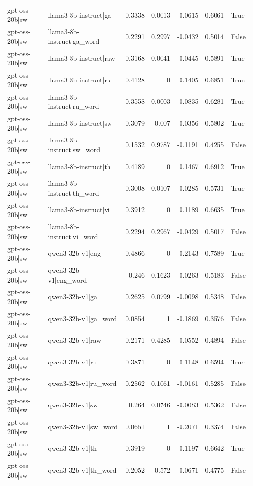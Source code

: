 \begin{table}
\begin{tabular}{l l r r r r l}
gpt-oss-20b|sw & llama3-8b-instruct|ga & 0.3338 & 0.0013 & 0.0615 & 0.6061 & True \\
gpt-oss-20b|sw & llama3-8b-instruct|ga_word & 0.2291 & 0.2997 & -0.0432 & 0.5014 & False \\
gpt-oss-20b|sw & llama3-8b-instruct|raw & 0.3168 & 0.0041 & 0.0445 & 0.5891 & True \\
gpt-oss-20b|sw & llama3-8b-instruct|ru & 0.4128 & 0 & 0.1405 & 0.6851 & True \\
gpt-oss-20b|sw & llama3-8b-instruct|ru_word & 0.3558 & 0.0003 & 0.0835 & 0.6281 & True \\
gpt-oss-20b|sw & llama3-8b-instruct|sw & 0.3079 & 0.007 & 0.0356 & 0.5802 & True \\
gpt-oss-20b|sw & llama3-8b-instruct|sw_word & 0.1532 & 0.9787 & -0.1191 & 0.4255 & False \\
gpt-oss-20b|sw & llama3-8b-instruct|th & 0.4189 & 0 & 0.1467 & 0.6912 & True \\
gpt-oss-20b|sw & llama3-8b-instruct|th_word & 0.3008 & 0.0107 & 0.0285 & 0.5731 & True \\
gpt-oss-20b|sw & llama3-8b-instruct|vi & 0.3912 & 0 & 0.1189 & 0.6635 & True \\
gpt-oss-20b|sw & llama3-8b-instruct|vi_word & 0.2294 & 0.2967 & -0.0429 & 0.5017 & False \\
gpt-oss-20b|sw & qwen3-32b-v1|eng & 0.4866 & 0 & 0.2143 & 0.7589 & True \\
gpt-oss-20b|sw & qwen3-32b-v1|eng_word & 0.246 & 0.1623 & -0.0263 & 0.5183 & False \\
gpt-oss-20b|sw & qwen3-32b-v1|ga & 0.2625 & 0.0799 & -0.0098 & 0.5348 & False \\
gpt-oss-20b|sw & qwen3-32b-v1|ga_word & 0.0854 & 1 & -0.1869 & 0.3576 & False \\
gpt-oss-20b|sw & qwen3-32b-v1|raw & 0.2171 & 0.4285 & -0.0552 & 0.4894 & False \\
gpt-oss-20b|sw & qwen3-32b-v1|ru & 0.3871 & 0 & 0.1148 & 0.6594 & True \\
gpt-oss-20b|sw & qwen3-32b-v1|ru_word & 0.2562 & 0.1061 & -0.0161 & 0.5285 & False \\
gpt-oss-20b|sw & qwen3-32b-v1|sw & 0.264 & 0.0746 & -0.0083 & 0.5362 & False \\
gpt-oss-20b|sw & qwen3-32b-v1|sw_word & 0.0651 & 1 & -0.2071 & 0.3374 & False \\
gpt-oss-20b|sw & qwen3-32b-v1|th & 0.3919 & 0 & 0.1197 & 0.6642 & True \\
gpt-oss-20b|sw & qwen3-32b-v1|th_word & 0.2052 & 0.572 & -0.0671 & 0.4775 & False \\

\end{tabular}
\end{table}
